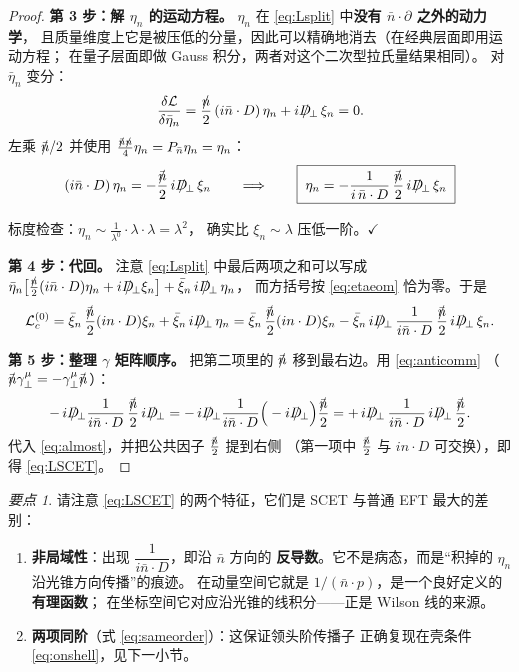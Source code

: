 \documentclass[UTF8,a4paper,11pt]{ctexart}
\theoremstyle{definition}
\theoremstyle{remark}
\newtheorem{keypoint}{要点}[section]
\theoremstyle{plain}
\newcommand{\nsl}{n\mkern-10.5mu/\mkern1.5mu}
\newcommand{\nbsl}{\bar{n}\mkern-10.5mu/\mkern1.5mu}
\newcommand{\Dsl}{D\mkern-11.5mu/}
\begin{document}
\begin{proof}
\textbf{第 3 步：解 $\eta_n$ 的运动方程。}
$\eta_n$ 在 \eqref{eq:Lsplit} 中\textbf{没有 $\bar n\cdot\partial$ 之外的动力学}，
且质量维度上它是被压低的分量，因此可以精确地消去（在经典层面即用运动方程；
在量子层面即做 Gauss 积分，两者对这个二次型拉氏量结果相同）。
对 $\bar\eta_n$ 变分：
\begin{equation}
  \frac{\delta\mathcal L}{\delta\bar\eta_n}
  =\frac{\nsl}{2}\,(i\bar n\cdot D)\,\eta_n+i\Dsl_\perp\,\xi_n=0 .
  \label{eq:etaeom}
\end{equation}
左乘 $\nbsl/2$ 并使用 $\frac{\nbsl\nsl}{4}\eta_n=P_{\bar n}\eta_n=\eta_n$：
\begin{equation}
  (i\bar n\cdot D)\,\eta_n
  =-\frac{\nbsl}{2}\,i\Dsl_\perp\,\xi_n
  \qquad\Longrightarrow\qquad
  \boxed{\;\eta_n=-\frac{1}{i\,\bar n\cdot D}\,\frac{\nbsl}{2}\,i\Dsl_\perp\,\xi_n\;}
  \label{eq:etasol}
\end{equation}

标度检查：$\eta_n\sim\frac{1}{\lambda^0}\cdot\lambda\cdot\lambda=\lambda^2$，
确实比 $\xi_n\sim\lambda$ 压低一阶。$\checkmark$

\textbf{第 4 步：代回。}
注意 \eqref{eq:Lsplit} 中最后两项之和可以写成
$\bar\eta_n\big[\frac{\nsl}{2}(i\bar n\cdot D)\eta_n+i\Dsl_\perp\xi_n\big]
+\bar\xi_n\,i\Dsl_\perp\,\eta_n$，
而方括号按 \eqref{eq:etaeom} 恰为零。于是
\begin{equation}
  \mathcal L_c^{(0)}
  =\bar\xi_n\,\frac{\nbsl}{2}(i n\cdot D)\xi_n
   +\bar\xi_n\,i\Dsl_\perp\,\eta_n
  =\bar\xi_n\,\frac{\nbsl}{2}(i n\cdot D)\xi_n
   -\bar\xi_n\,i\Dsl_\perp\,\frac{1}{i\bar n\cdot D}\,\frac{\nbsl}{2}\,i\Dsl_\perp\,\xi_n .
  \label{eq:almost}
\end{equation}

\textbf{第 5 步：整理 $\gamma$ 矩阵顺序。}
把第二项里的 $\nbsl$ 移到最右边。用 \eqref{eq:anticomm}
（$\nbsl\gamma_\perp^\mu=-\gamma_\perp^\mu\nbsl$）：
\begin{equation}
  -\,i\Dsl_\perp\frac{1}{i\bar n\cdot D}\,\frac{\nbsl}{2}\,i\Dsl_\perp
  =-\,i\Dsl_\perp\frac{1}{i\bar n\cdot D}\Big(-i\Dsl_\perp\Big)\frac{\nbsl}{2}
  =+\,i\Dsl_\perp\,\frac{1}{i\bar n\cdot D}\,i\Dsl_\perp\,\frac{\nbsl}{2} .
\end{equation}
代入 \eqref{eq:almost}，并把公共因子 $\frac{\nbsl}{2}$ 提到右侧
（第一项中 $\frac{\nbsl}{2}$ 与 $in\cdot D$ 可交换），即得 \eqref{eq:LSCET}。
\end{proof}

\begin{keypoint}
请注意 \eqref{eq:LSCET} 的两个特征，它们是 SCET 与普通 EFT 最大的差别：
\begin{enumerate}[label=(\arabic*)]
  \item \textbf{非局域性}：出现 $\dfrac{1}{i\bar n\cdot D}$，即沿 $\bar n$ 方向的
        \textbf{反导数}。它不是病态，而是“积掉的 $\eta_n$ 沿光锥方向传播”的痕迹。
        在动量空间它就是 $1/(\bar n\cdot p)$，是一个良好定义的\textbf{有理函数}；
        在坐标空间它对应沿光锥的线积分——正是 Wilson 线的来源。
  \item \textbf{两项同阶}（式 \eqref{eq:sameorder}）：这保证领头阶传播子
        正确复现在壳条件 \eqref{eq:onshell}，见下一小节。
\end{enumerate}
\end{keypoint}
\end{document}
